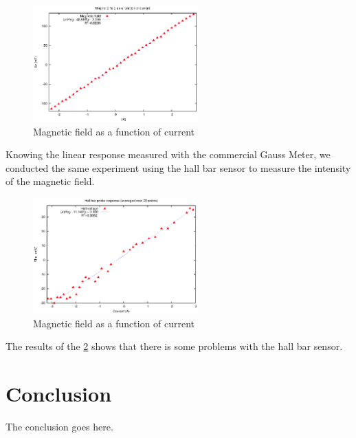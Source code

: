 \documentclass[journal]{IEEEtran}
\begin{document}
\begin{figure}[h]
\centering
\includegraphics[width=2.5in]{champ_fonction_courant.eps}
\caption{Magnetic field as a function of current}
\label{fig:linear_gauss}
\end{figure}

Knowing the linear response measured with the commercial Gauss Meter, we conducted the same experiment using the hall bar sensor to measure the intensity of the magnetic field.

\begin{figure}[h]
\centering

\includegraphics[width=2.5in]{rampe_courant_20.eps}
\caption{Magnetic field as a function of current}
\label{fig:linear_hall_20}
\end{figure}

The results of the \figurename \ref{fig:linear_hall_20} shows that there is some problems with the hall bar sensor.





\section{Conclusion}
The conclusion goes here.





\end{document}
